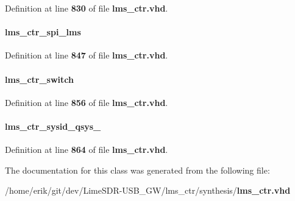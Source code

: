 Definition at line {\bf 830} of file {\bf lms\+\_\+ctr.\+vhd}.

\paragraph[{spi\+\_\+lms}]{ {\bfseries \textcolor{vhdlchar}{lms\+\_\+ctr\+\_\+spi\+\_\+lms}\textcolor{vhdlchar}{ }} \hspace{0.3cm}{\ttfamily [Instantiation]}}\label{classlms__ctr_1_1rtl_a6839742104cf9ab9203d9373812cd7c2}


Definition at line {\bf 847} of file {\bf lms\+\_\+ctr.\+vhd}.

\paragraph[{switch}]{ {\bfseries \textcolor{vhdlchar}{lms\+\_\+ctr\+\_\+switch}\textcolor{vhdlchar}{ }} \hspace{0.3cm}{\ttfamily [Instantiation]}}\label{classlms__ctr_1_1rtl_adaff824198ef1c3b2c83236da476dad6}


Definition at line {\bf 856} of file {\bf lms\+\_\+ctr.\+vhd}.

\paragraph[{sysid\+\_\+qsys\+\_\+0}]{ {\bfseries \textcolor{vhdlchar}{lms\+\_\+ctr\+\_\+sysid\+\_\+qsys\+\_}\textcolor{vhdlchar}{ }} \hspace{0.3cm}{\ttfamily [Instantiation]}}\label{classlms__ctr_1_1rtl_ad44006840e07a29cac6b44011ce57136}


Definition at line {\bf 864} of file {\bf lms\+\_\+ctr.\+vhd}.



The documentation for this class was generated from the following file\+:\begin{DoxyCompactItemize}
\item 
/home/erik/git/dev/\+Lime\+S\+D\+R-\/\+U\+S\+B\+\_\+\+G\+W/lms\+\_\+ctr/synthesis/{\bf lms\+\_\+ctr.\+vhd}\end{DoxyCompactItemize}
